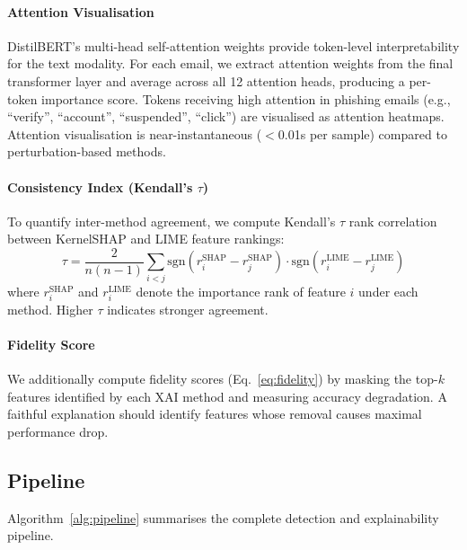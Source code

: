 \documentclass[conference]{IEEEtran}
\begin{document}
\paragraph{Attention Visualisation}
DistilBERT's multi-head self-attention weights provide token-level
interpretability for the text modality. For each email, we extract attention
weights from the final transformer layer and average across all 12 attention
heads, producing a per-token importance score. Tokens receiving high
attention in phishing emails (e.g., ``verify'', ``account'', ``suspended'',
``click'') are visualised as attention heatmaps. Attention visualisation
is near-instantaneous ($<$0.01s per sample) compared to perturbation-based
methods.

\paragraph{Consistency Index (Kendall's $\tau$)}
To quantify inter-method agreement, we compute Kendall's $\tau$ rank
correlation between KernelSHAP and LIME feature rankings:
\begin{equation}
  \tau = \frac{2}{n(n-1)} \sum_{i<j} \text{sgn}(r_i^{\text{SHAP}} - r_j^{\text{SHAP}}) \cdot \text{sgn}(r_i^{\text{LIME}} - r_j^{\text{LIME}})
  \label{eq:kendall}
\end{equation}
where $r_i^{\text{SHAP}}$ and $r_i^{\text{LIME}}$ denote the importance
rank of feature $i$ under each method. Higher $\tau$ indicates stronger
agreement.

\paragraph{Fidelity Score}
We additionally compute fidelity scores (Eq.~\ref{eq:fidelity}) by masking
the top-$k$ features identified by each XAI method and measuring accuracy
degradation. A faithful explanation should identify features whose removal
causes maximal performance drop.

\subsection{Pipeline}
\label{subsec:pipeline}

Algorithm~\ref{alg:pipeline} summarises the complete detection and
explainability pipeline.
\end{document}
